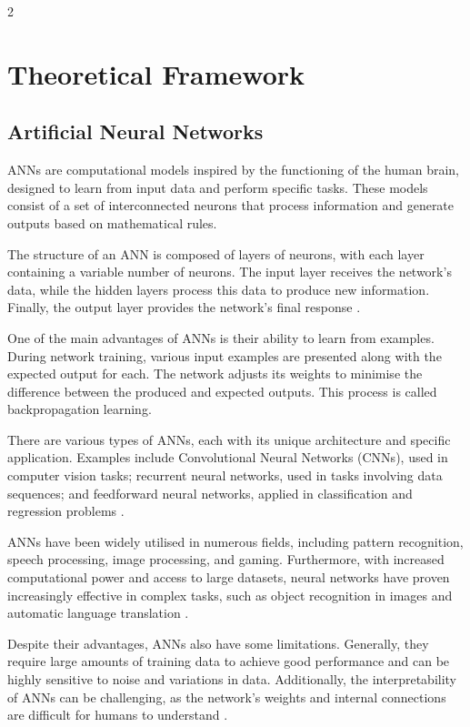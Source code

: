 \documentclass[a4paper,twoside,12pt]{article}
\begin{document}
\begin{multicols}{2}
\section{Theoretical Framework}

\subsection{Artificial Neural Networks}

ANNs are computational models inspired by the functioning of the human brain, designed to learn from input data and perform specific tasks. These models consist of a set of interconnected neurons that process information and generate outputs based on mathematical rules.

The structure of an ANN is composed of layers of neurons, with each layer containing a variable number of neurons. The input layer receives the network's data, while the hidden layers process this data to produce new information. Finally, the output layer provides the network’s final response \cite{5}.

One of the main advantages of ANNs is their ability to learn from examples. During network training, various input examples are presented along with the expected output for each. The network adjusts its weights to minimise the difference between the produced and expected outputs. This process is called backpropagation learning.

There are various types of ANNs, each with its unique architecture and specific application. Examples include Convolutional Neural Networks (CNNs), used in computer vision tasks; recurrent neural networks, used in tasks involving data sequences; and feedforward neural networks, applied in classification and regression problems \cite{6}.

ANNs have been widely utilised in numerous fields, including pattern recognition, speech processing, image processing, and gaming. Furthermore, with increased computational power and access to large datasets, neural networks have proven increasingly effective in complex tasks, such as object recognition in images and automatic language translation \cite{7}.

Despite their advantages, ANNs also have some limitations. Generally, they require large amounts of training data to achieve good performance and can be highly sensitive to noise and variations in data. Additionally, the interpretability of ANNs can be challenging, as the network’s weights and internal connections are difficult for humans to understand \cite{8}.


\end{multicols}
\end{document}
